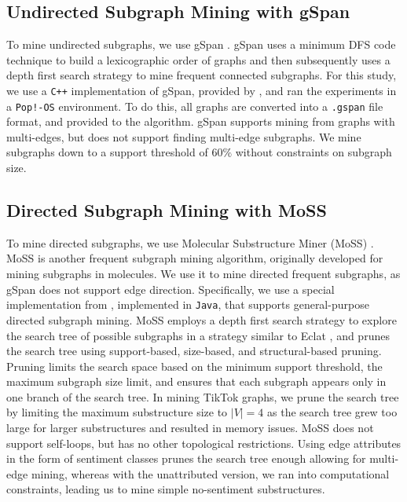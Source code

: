 
\subsection{Undirected Subgraph Mining with gSpan}
To mine undirected subgraphs, we use gSpan \citep{yan2002gspan}. gSpan uses a minimum DFS code technique to build a lexicographic order of graphs and then subsequently uses a depth first search strategy to mine frequent connected subgraphs. For this study, we use a \texttt{C++} implementation of gSpan, provided by \cite{yan2009gspansoftware}, and ran the experiments in a \texttt{Pop!-OS} environment. To do this, all graphs are converted into a \texttt{.gspan} file format, and provided to the algorithm. gSpan supports mining from graphs with multi-edges, but does not support finding multi-edge subgraphs. We mine subgraphs down to a support threshold of $60\%$ without constraints on subgraph size. 

\subsection{Directed Subgraph Mining with MoSS}
To mine directed subgraphs, we use Molecular Substructure Miner (MoSS) \citep{borgelt2002moss}. MoSS is another frequent subgraph mining algorithm, originally developed for mining subgraphs in molecules. We use it to mine directed frequent subgraphs, as gSpan does not support edge direction. Specifically, we use a special implementation from \cite{gamer_moss}, implemented in \texttt{Java}, that supports general-purpose directed subgraph mining. MoSS employs a depth first search strategy to explore the search tree of possible subgraphs in a strategy similar to Eclat \citep{zaki1997new}, and prunes the search tree using support-based, size-based, and structural-based pruning. Pruning limits the search space based on the minimum support threshold, the maximum subgraph size limit, and ensures that each subgraph appears only in one branch of the search tree. In mining TikTok graphs, we prune the search tree by limiting the maximum substructure size to $|V|=4$ as the search tree grew too large for larger substructures and resulted in memory issues. MoSS does not support self-loops, but has no other topological restrictions. Using edge attributes in the form of sentiment classes prunes the search tree enough allowing for multi-edge mining, whereas with the unattributed version, we ran into computational constraints, leading us to mine simple no-sentiment substructures. 


